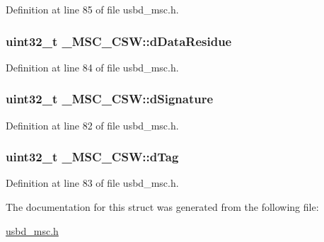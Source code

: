 Definition at line 85 of file usbd\+\_\+msc.\+h.

\subsubsection[{\texorpdfstring{d\+Data\+Residue}{dDataResidue}}]{\setlength{\rightskip}{0pt plus 5cm}uint32\+\_\+t \+\_\+\+M\+S\+C\+\_\+\+C\+S\+W\+::d\+Data\+Residue}\hypertarget{struct__MSC__CSW_a58a9d983a1e1707b9a99ad1a61acae72}{}\label{struct__MSC__CSW_a58a9d983a1e1707b9a99ad1a61acae72}


Definition at line 84 of file usbd\+\_\+msc.\+h.

\subsubsection[{\texorpdfstring{d\+Signature}{dSignature}}]{\setlength{\rightskip}{0pt plus 5cm}uint32\+\_\+t \+\_\+\+M\+S\+C\+\_\+\+C\+S\+W\+::d\+Signature}\hypertarget{struct__MSC__CSW_ab5e9fc6fcc75f4b6e5ca7aada1443913}{}\label{struct__MSC__CSW_ab5e9fc6fcc75f4b6e5ca7aada1443913}


Definition at line 82 of file usbd\+\_\+msc.\+h.

\subsubsection[{\texorpdfstring{d\+Tag}{dTag}}]{\setlength{\rightskip}{0pt plus 5cm}uint32\+\_\+t \+\_\+\+M\+S\+C\+\_\+\+C\+S\+W\+::d\+Tag}\hypertarget{struct__MSC__CSW_a6b340e8049b2f6b06d3747b42db1ebac}{}\label{struct__MSC__CSW_a6b340e8049b2f6b06d3747b42db1ebac}


Definition at line 83 of file usbd\+\_\+msc.\+h.



The documentation for this struct was generated from the following file\+:\begin{DoxyCompactItemize}
\item 
\hyperlink{usbd__msc_8h}{usbd\+\_\+msc.\+h}\end{DoxyCompactItemize}
